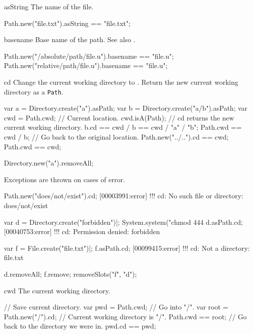 \begin{urbiscriptapi}
\item[asString]
  The name of the file.
\begin{urbiassert}
Path.new("file.txt").asString == "file.txt";
\end{urbiassert}


\item[basename]%
  Base name of the path.  See also .
\begin{urbiassert}
Path.new("/absolute/path/file.u").basename == "file.u";
Path.new("relative/path/file.u").basename  == "file.u";
\end{urbiassert}


\item[cd]%
  Change the current working directory to \this. Return the new current
  working directory as a \lstinline|Path|.
\begin{urbiassert}
var a = Directory.create("a").asPath;
var b = Directory.create("a/b").asPath;
var cwd = Path.cwd;     // Current location.
cwd.isA(Path);
// cd returns the new current working directory.
b.cd == cwd / b == cwd / "a" / "b";
Path.cwd == cwd / b;
// Go back to the original location.
Path.new("../..").cd == cwd;
Path.cwd == cwd;
\end{urbiassert}
\begin{urbicomment}
Directory.new("a").removeAll;
\end{urbicomment}

Exceptions are thrown on cases of error.
\begin{urbiscript}
Path.new("does/not/exist").cd;
[00003991:error] !!! cd: No such file or directory: does/not/exist

var d = Directory.create("forbidden")|;
System.system("chmod 444 %
d.asPath.cd;
[00040753:error] !!! cd: Permission denied: forbidden

var f = File.create("file.txt")|;
f.asPath.cd;
[00099415:error] !!! cd: Not a directory: file.txt
\end{urbiscript}
\begin{urbicomment}
d.removeAll;
f.remove;
removeSlots("f", "d");
\end{urbicomment}

\item[cwd]%
  The current working directory.
\begin{urbiassert}
// Save current directory.
var pwd = Path.cwd;
// Go into "/".
var root = Path.new("/").cd;
// Current working directory is "/".
Path.cwd == root;
// Go back to the directory we were in.
pwd.cd == pwd;
\end{urbiassert}


\end{urbiscriptapi}
